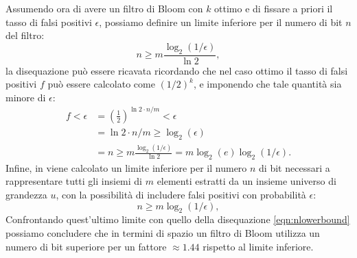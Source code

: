 \documentclass[../../main.tex]{subfiles}
\begin{document}
Assumendo ora di avere un filtro di Bloom con $k$ ottimo e di fissare a priori il tasso di falsi positivi $\epsilon$, possiamo definire un limite inferiore per il numero di bit $n$ del filtro: 
\begin{equation}
    n \geq m \frac{\log_2(1/\epsilon)}{\ln2},
    \label{eqn:nlowerbound}
\end{equation}
la disequazione può essere ricavata ricordando che nel caso ottimo il tasso di falsi positivi $f$ può essere calcolato come $\left(1/2\right)^k$, e imponendo che tale quantità sia minore di $\epsilon$:
\begin{align*}
    f < \epsilon &= \left(\frac{1}{2}\right)^{\ln2 \cdot n/m} < \epsilon\\
    &= \ln2 \cdot n/m \geq \log_2(\epsilon) \\
    &= n \geq m \frac{\log_2(1/\epsilon)}{\ln2} = m \log_2(e) \log_2(1/\epsilon) .
\end{align*}
Infine, in \cite{Broder2005} viene calcolato un limite inferiore per il numero $n$ di bit necessari a rappresentare tutti gli insiemi di $m$ elementi estratti da un insieme universo di grandezza $u$, con la possibilità di includere falsi positivi con probabilità $\epsilon$:
\[n \geq m \log_2(1/\epsilon),\]
Confrontando quest'ultimo limite con quello della disequazione \ref{eqn:nlowerbound} possiamo concludere che in termini di spazio un filtro di Bloom utilizza un numero di bit superiore per un fattore $\approx 1.44$ rispetto al limite inferiore.
\end{document}
